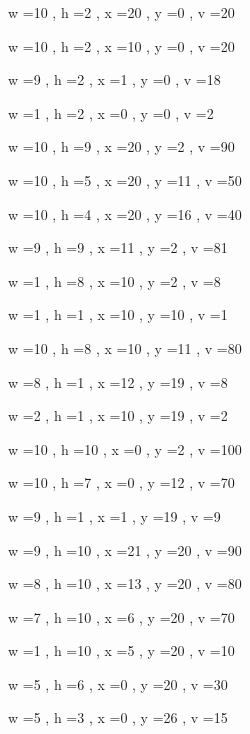 \documentclass[11pt]{article}
\begin{document}
w =10 , h =2 , x =20 , y =0 , v =20
\par
w =10 , h =2 , x =10 , y =0 , v =20
\par
w =9 , h =2 , x =1 , y =0 , v =18
\par
w =1 , h =2 , x =0 , y =0 , v =2
\par
w =10 , h =9 , x =20 , y =2 , v =90
\par
w =10 , h =5 , x =20 , y =11 , v =50
\par
w =10 , h =4 , x =20 , y =16 , v =40
\par
w =9 , h =9 , x =11 , y =2 , v =81
\par
w =1 , h =8 , x =10 , y =2 , v =8
\par
w =1 , h =1 , x =10 , y =10 , v =1
\par
w =10 , h =8 , x =10 , y =11 , v =80
\par
w =8 , h =1 , x =12 , y =19 , v =8
\par
w =2 , h =1 , x =10 , y =19 , v =2
\par
w =10 , h =10 , x =0 , y =2 , v =100
\par
w =10 , h =7 , x =0 , y =12 , v =70
\par
w =9 , h =1 , x =1 , y =19 , v =9
\par
w =9 , h =10 , x =21 , y =20 , v =90
\par
w =8 , h =10 , x =13 , y =20 , v =80
\par
w =7 , h =10 , x =6 , y =20 , v =70
\par
w =1 , h =10 , x =5 , y =20 , v =10
\par
w =5 , h =6 , x =0 , y =20 , v =30
\par
w =5 , h =3 , x =0 , y =26 , v =15
\par
\newpage


\end{document}
